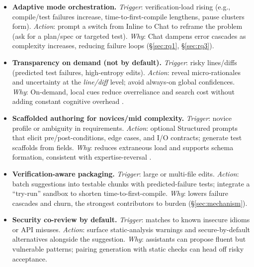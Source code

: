 \documentclass[sigconf]{acmart}
\begin{document}
\begin{itemize}[leftmargin=1.25em]
  \item \textbf{Adaptive mode orchestration.} \emph{Trigger}: verification-load rising (e.g., compile/test failures increase, time-to-first-compile lengthens, pause clusters form). \emph{Action}: prompt a switch from Inline to Chat to reframe the problem (ask for a plan/spec or targeted test). \emph{Why}: Chat dampens error cascades as complexity increases, reducing failure loops (\S\ref{sec:rq1}, \S\ref{sec:rq3}).
  \item \textbf{Transparency on demand (not by default).} \emph{Trigger}: risky lines/diffs (predicted test failures, high-entropy edits). \emph{Action}: reveal micro‑rationales and uncertainty at the \emph{line/diff} level; avoid always‑on global confidences. \emph{Why}: On‑demand, local cues reduce overreliance and search cost without adding constant cognitive overhead \cite{vasconcelos2025generation}.
  \item \textbf{Scaffolded authoring for novices/mid complexity.} \emph{Trigger}: novice profile or ambiguity in requirements. \emph{Action}: optional Structured prompts that elicit pre/post-conditions, edge cases, and I/O contracts; generate test scaffolds from fields. \emph{Why}: reduces extraneous load and supports schema formation, consistent with expertise-reversal \cite{kalyuga2007expertise,sweller2019cognitive}.
  \item \textbf{Verification-aware packaging.} \emph{Trigger}: large or multi-file edits. \emph{Action}: batch suggestions into testable chunks with predicted-failure tests; integrate a ``try-run'' sandbox to shorten time-to-first-compile. \emph{Why}: lowers failure cascades and churn, the strongest contributors to burden (\S\ref{sec:mechanism}).
  \item \textbf{Security co-review by default.} \emph{Trigger}: matches to known insecure idioms or API misuses. \emph{Action}: surface static-analysis warnings and secure-by-default alternatives alongside the suggestion. \emph{Why}: assistants can propose fluent but vulnerable patterns; pairing generation with static checks can head off risky acceptance.
\end{itemize}
\end{document}
